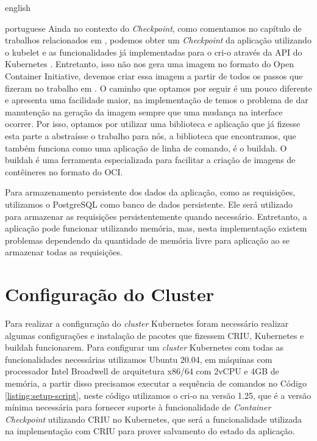\begin{otherlanguage*}{english}
\begin{otherlanguage*}{portuguese}
Ainda no contexto do \textit{Checkpoint}, como comentamos no capítulo de trabalhos
relacionados em \cite{schmidttransparent}, podemos obter um \textit{Checkpoint} da
aplicação utilizando o kubelet e as funcionalidades já implementadas para o cri-o
através da API do Kubernetes \cite{kubernetes:container-checkpoint}. Entretanto,
isso não nos gera uma imagem no formato do Open Container Initiative, devemos criar
essa imagem a partir de todos os passos que fizeram no trabalho em
\cite{schmidttransparent}. O caminho que optamos por seguir é um pouco diferente e
apresenta uma facilidade maior, na implementação de \cite{schmidttransparent} temos
o problema de dar manutenção na geração da imagem sempre que uma mudança na interface
ocorrer. Por isso, optamos por utilizar uma biblioteca e aplicação que já fizesse esta
parte a abstraísse o trabalho para nós, a biblioteca que encontramos, que também
funciona como uma aplicação de linha de comando, é o buildah\cite{buildah}. O buildah é
uma ferramenta especializada para facilitar a criação de imagens de contêineres no formato
do OCI.

Para armazenamento persistente dos dados da aplicação, como as requisições, utilizamos
o PostgreSQL \cite{postgresql} como banco de dados persistente. Ele será utilizado para
armazenar as requisições persistentemente quando necessário. Entretanto, a aplicação
pode funcionar utilizando memória, mas, nesta implementação existem problemas dependendo
da quantidade de memória livre para aplicação ao se armazenar todas as requisições.

\section{Configuração do Cluster}

Para realizar a configuração do \textit{cluster} Kubernetes foram necessário realizar
algumas configurações e instalação de pacotes que fizessem CRIU, Kubernetes e buildah
funcionarem. Para configurar um \textit{cluster} Kubernetes com todas as funcionalidades
necessárias utilizamos Ubuntu 20.04, em máquinas com processador Intel Broadwell de
arquitetura x86/64 com 2vCPU e 4GB de memória, a partir disso precisamos executar a
sequência de comandos no Código \ref{listing:setup-script}, neste código utilizamos
o cri-o na versão 1.25, que é a versão mínima necessária para fornecer suporte à
funcionalidade de \textit{Container Checkpoint} utilizando CRIU no Kubernetes, que será
a funcionalidade utilizada na implementação com CRIU para prover salvamento do estado
da aplicação.


\end{otherlanguage*}
\end{otherlanguage*}
